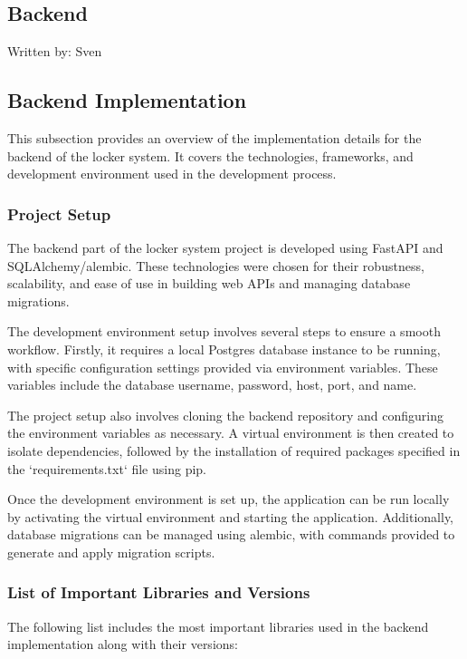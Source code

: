 \subsection{Backend}
{\tiny Written by: Sven}

\subsection{Backend Implementation}

This subsection provides an overview of the implementation details for the backend of the locker system. It covers the technologies, frameworks, and development environment used in the development process.

\subsubsection{Project Setup}

The backend part of the locker system project is developed using FastAPI and SQLAlchemy/alembic. These technologies were chosen for their robustness, scalability, and ease of use in building web APIs and managing database migrations.

The development environment setup involves several steps to ensure a smooth workflow. Firstly, it requires a local Postgres database instance to be running, with specific configuration settings provided via environment variables. These variables include the database username, password, host, port, and name.

The project setup also involves cloning the backend repository and configuring the environment variables as necessary. A virtual environment is then created to isolate dependencies, followed by the installation of required packages specified in the `requirements.txt` file using pip.

Once the development environment is set up, the application can be run locally by activating the virtual environment and starting the application. Additionally, database migrations can be managed using alembic, with commands provided to generate and apply migration scripts.

\subsubsection{List of Important Libraries and Versions}

The following list includes the most important libraries used in the backend implementation along with their versions:


